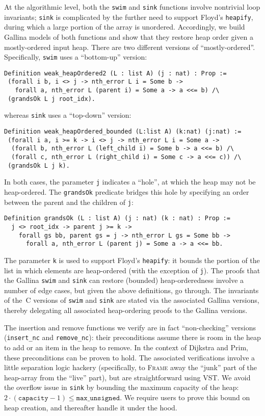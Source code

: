 At the algorithmic level, both the \texttt{swim} and \texttt{sink} functions involve nontrivial loop invariants; \texttt{sink} is complicated by the further need to support Floyd's \texttt{heapify}, during which a large portion of the array is unordered.  Accordingly, we build Gallina models of both functions and show that they restore heap order given a mostly-ordered input heap.  There are two different versions of ``mostly-ordered''. Specifically, \texttt{swim} uses a ``bottom-up'' version:
\begin{lstlisting}
Definition weak_heapOrdered2 (L : list A) (j : nat) : Prop :=
 (forall i b, i <> j -> nth_error L i = Some b ->
   forall a, nth_error L (parent i) = Some a -> a <<= b) /\
 (grandsOk L j root_idx).
\end{lstlisting}
whereas \texttt{sink} uses a ``top-down'' version:
\begin{lstlisting}
Definition weak_heapOrdered_bounded (L:list A) (k:nat) (j:nat) :=
 (forall i a, i >= k -> i <> j -> nth_error L i = Some a ->
  (forall b, nth_error L (left_child i) = Some b -> a <<= b) /\
  (forall c, nth_error L (right_child i) = Some c -> a <<= c)) /\
 (grandsOk L j k).
\end{lstlisting}
In both cases, the parameter \texttt{j} indicates a ``hole'', at which the heap may not be heap-ordered.  The \texttt{grandsOk} predicate bridges this hole by 
specifying an order between the parent and the children of \texttt{j}:
\begin{lstlisting}
Definition grandsOk (L : list A) (j : nat) (k : nat) : Prop :=
  j <> root_idx -> parent j >= k ->
    forall gs bb, parent gs = j -> nth_error L gs = Some bb ->
      forall a, nth_error L (parent j) = Some a -> a <<= bb.
\end{lstlisting}
The parameter \texttt{k} is used to support Floyd's \texttt{heapify}: it bounds the portion of the list in which elements are heap-ordered (with the exception of \texttt{j}).  The proofs that the Gallina \texttt{swim} and \texttt{sink} can restore (bounded) heap-orderedness involve a number of edge cases, but given the above definitions, go through.  The invariants of the~C versions of \texttt{swim} and \texttt{sink} are stated via the associated 
Gallina versions, thereby delegating all associated heap-ordering proofs to the Gallina versions.

The insertion and remove functions we verify are in fact ``non-checking'' versions (\texttt{insert\_nc} and \texttt{remove\_nc}): their preconditions assume there is room in the heap to add or an item in the heap to remove.  In the context of Dijkstra and Prim, these preconditions can be proven to hold.  The associated verifications involve a little separation logic hackery (specifically, to \textsc{Frame} away the ``junk'' part of the heap-array from the ``live'' part), but are straightforward using VST.  We avoid the overflow issue in \texttt{sink} by bounding the maximum capacity of the heap: $2\cdot(\texttt{capacity} - 1) \leq \texttt{max\_unsigned}$.  We require users to prove this bound on heap creation, and thereafter handle it under the hood.

